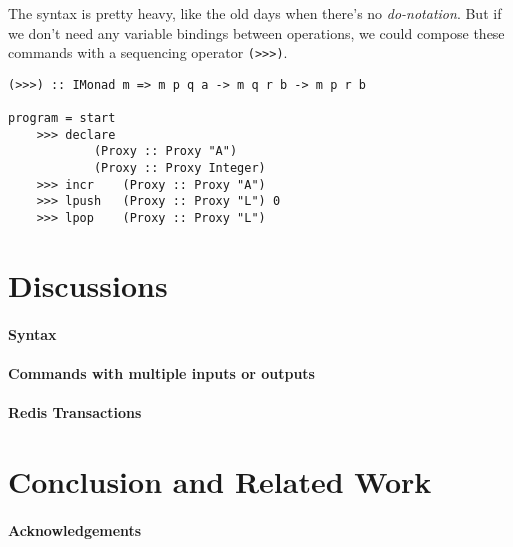 \documentclass[pldi]{sigplanconf-pldi16}
\begin{document}
The syntax is pretty heavy, like the old days when there's no
 \emph{do-notation}\cite{history}. But if we don't need any variable bindings
 between operations, we could compose these commands with a sequencing operator
 \texttt{(>>>)}.

\begin{verbatim}
(>>>) :: IMonad m => m p q a -> m q r b -> m p r b

program = start
    >>> declare
            (Proxy :: Proxy "A")
            (Proxy :: Proxy Integer)
    >>> incr    (Proxy :: Proxy "A")
    >>> lpush   (Proxy :: Proxy "L") 0
    >>> lpop    (Proxy :: Proxy "L")
\end{verbatim}

\section{Discussions}
\paragraph{Syntax}
\paragraph{Commands with multiple inputs or outputs}
\paragraph{Redis Transactions}
\section{Conclusion and Related Work}
\paragraph{Acknowledgements}




\end{document}
